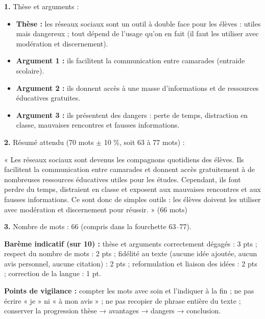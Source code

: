 \documentclass[11pt]{article}
\begin{document}
\begin{corrige}
\textbf{1.} Thèse et arguments :
\begin{itemize}
\item \textbf{Thèse :} les réseaux sociaux sont un outil à double face pour les élèves : utiles mais dangereux ; tout dépend de l'usage qu'on en fait (il faut les utiliser avec modération et discernement).
\item \textbf{Argument 1 :} ils facilitent la communication entre camarades (entraide scolaire).
\item \textbf{Argument 2 :} ils donnent accès à une masse d'informations et de ressources éducatives gratuites.
\item \textbf{Argument 3 :} ils présentent des dangers : perte de temps, distraction en classe, mauvaises rencontres et fausses informations.
\end{itemize}

\textbf{2.} Résumé attendu (70 mots $\pm$ 10 \%, soit 63 à 77 mots) :

« Les réseaux sociaux sont devenus les compagnons quotidiens des élèves. Ils facilitent la communication entre camarades et donnent accès gratuitement à de nombreuses ressources éducatives utiles pour les études. Cependant, ils font perdre du temps, distraient en classe et exposent aux mauvaises rencontres et aux fausses informations. Ce sont donc de simples outils : les élèves doivent les utiliser avec modération et discernement pour réussir. » (66 mots)

\textbf{3.} Nombre de mots : 66 (compris dans la fourchette 63--77).

\textbf{Barème indicatif (sur 10) :} thèse et arguments correctement dégagés : 3 pts ; respect du nombre de mots : 2 pts ; fidélité au texte (aucune idée ajoutée, aucun avis personnel, aucune citation) : 2 pts ; reformulation et liaison des idées : 2 pts ; correction de la langue : 1 pt.

\textbf{Points de vigilance :} compter les mots avec soin et l'indiquer à la fin ; ne pas écrire « je » ni « à mon avis » ; ne pas recopier de phrase entière du texte ; conserver la progression thèse → avantages → dangers → conclusion.
\end{corrige}
\end{document}
